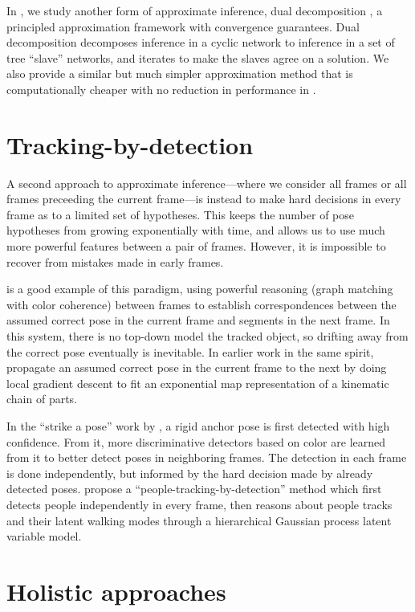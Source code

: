In , we study another form of approximate inference, dual 
decomposition \citep{komodakis2007}, a principled approximation framework with 
convergence guarantees.  Dual decomposition decomposes inference in a cyclic 
network to inference in a set of tree ``slave'' networks, and iterates to make 
the slaves agree on a solution.  We also provide a similar but much simpler 
approximation method that is computationally cheaper with no reduction in 
performance in .


\section{Tracking-by-detection}  A second approach to approximate 
inference---where we consider all frames or all frames preceeding the current 
frame---is instead to make hard decisions in every frame as to a limited set of 
hypotheses.  This keeps the number of pose hypotheses from growing 
exponentially with time, and allows us to use much more powerful features 
between a pair of frames.  However, it is impossible to recover from mistakes 
made in early frames.

\citet{ren07} is a good example of this paradigm, using powerful reasoning 
(graph matching with color coherence) between frames to establish 
correspondences between the assumed correct pose in the current frame and 
segments in the next frame.  In this system, there is no top-down model the 
tracked object, so drifting away from the correct pose eventually is 
inevitable.  In earlier work in the same spirit, \citet{bregler98} propagate an 
assumed correct pose in the current frame to the next by doing local gradient 
descent to fit an exponential map representation of a kinematic chain of parts.

In the ``strike a pose'' work by \citet{strikeapose}, a rigid anchor pose is 
first detected with high confidence.  From it, more discriminative detectors 
based on color are learned from it to better detect poses in neighboring 
frames.  The detection in each frame is done independently, but informed by the 
hard decision made by already detected poses. \citet{andriluka2008people} 
propose a ``people-tracking-by-detection'' method which first detects people 
independently in every frame, then reasons about people tracks and their latent 
walking modes through a hierarchical Gaussian process latent variable model.



\section{Holistic approaches}\label{sec:nonpart}

